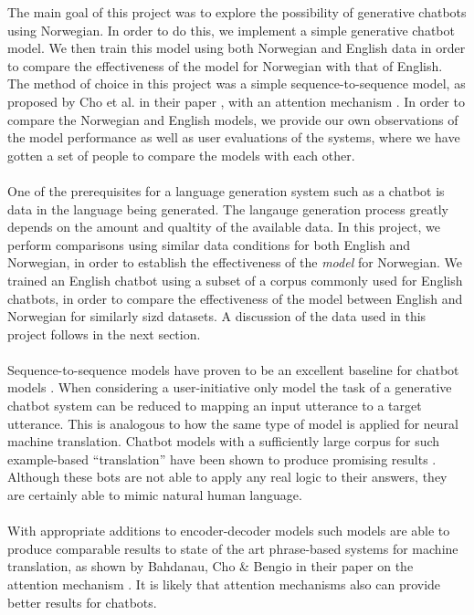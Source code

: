 \documentclass{article}
\begin{document}
The main goal of this project was to explore the possibility of generative
chatbots using Norwegian. In order to do this, we implement a simple generative
chatbot model. We then train this model using both Norwegian and English data
in order to compare the effectiveness of the model for Norwegian with that of
English. The method of choice in this project was a simple sequence-to-sequence
model, as proposed by Cho et al. in their paper \cite{Cho2014}, with an
attention mechanism \cite{Bahdanau2015}. In order to compare the Norwegian and
English models, we provide our own observations of the model performance as
well as user evaluations of the systems, where we have gotten a set of people
to compare the models with each other.

\paragraph{}
One of the prerequisites for a language generation system such as a chatbot is
data in the language being generated. The langauge generation process greatly
depends on the amount and qualtity of the available data. In this project, we
perform comparisons using similar data conditions for both English and Norwegian,
in order to establish the effectiveness of the \emph{model} for Norwegian. We
trained an English chatbot using a subset of a corpus commonly used for English
chatbots, in order to compare the effectiveness of the model between English
and Norwegian for similarly sizd datasets. A discussion of the data used in this
project follows in the next section.

\paragraph{}
Sequence-to-sequence models have proven to be an excellent baseline for
chatbot models \cite{Vinyals2015}. When considering a user-initiative only
model the task of a generative chatbot system can be reduced to mapping an
input utterance to a target utterance. This is analogous to how the same type
of model is applied for neural machine translation. Chatbot models with a
sufficiently large corpus for such example-based ``translation'' have been
shown to produce promising results \cite{Ezquerra2018}. Although these bots are
not able to apply any real logic to their answers, they are certainly able to
mimic natural human language.

\paragraph{}
With appropriate additions to encoder-decoder models such models are able to
produce comparable results to state of the art phrase-based systems for machine
translation, as shown by Bahdanau, Cho \& Bengio in their paper on the attention
mechanism \cite{Bahdanau2015}. It is likely that attention mechanisms also can
provide better results for chatbots.
\end{document}

